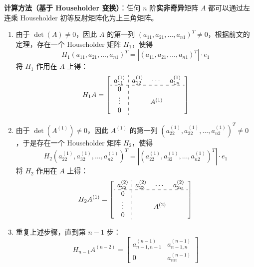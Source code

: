\noindent\textbf{计算方法（基于 Householder 变换）}：任何 $n$ 阶\textbf{实非奇异}矩阵 $A$ 都可以通过左连乘 Householder 初等反射矩阵化为上三角矩阵。
\begin{enumerate}
    \item 由于 $\det(A)\neq0$，因此 $A$ 的第一列 $(a_{11},a_{21},\ldots,a_{n1})^T\neq 0$，根据前文的定理，存在一个 Householder 矩阵 $H_1$，使得
    \[
        H_1(a_{11},a_{21},\ldots,a_{n1})^T=\left|(a_{11},a_{21},\ldots,a_{n1})^T\right|\cdot e_1
    \]
    将 $H_1$ 作用在 $A$ 上得：
    \[
        H_1A=\left[\begin{array}{c:ccc}
        a_{11}^{(1)}&a_{12}^{(1)}&\cdots&a_{1n}^{(1)}\\
        \hdashline
        0&&&\\
        \vdots&&A^{(1)}&\\
        0&&&
        \end{array}\right]
    \]
    
    \item 由于 $\det(A^{(1)})\neq0$，因此 $A^{(1)}$ 的第一列 $\left(a_{22}^{(1)},a_{32}^{(1)},\ldots,a_{n2}^{(1)}\right)^T\neq0$，于是存在一个 Householder 矩阵 $H_2$，使得
    \[
        H_2\left(a_{22}^{(1)},a_{32}^{(1)},\ldots,a_{n2}^{(1)}\right)^T=\left|\left(a_{22}^{(1)},a_{32}^{(1)},\ldots,a_{n2}^{(1)}\right)^T\right|\cdot e_1
    \]
    将 $H_2$ 作用在 $A$ 上得：
    \[
        H_2A^{(1)}=\left[\begin{array}{c:ccc}
        a_{22}^{(2)}&a_{23}^{(2)}&\cdots&a_{2n}^{(2)}\\
        \hdashline
        0&&&\\
        \vdots&&A^{(2)}&\\
        0&&&
        \end{array}\right]
    \]
   
    \item 重复上述步骤，直到第 $n-1$ 步：
    \[
        H_{n-1}A^{(n-2)}=\begin{bmatrix}a_{n-1,n-1}^{(n-1)}&a_{n-1,n}^{(n-1)}\\0&a_{nn}^{(n-1)}\end{bmatrix}
    \]


\end{enumerate}
